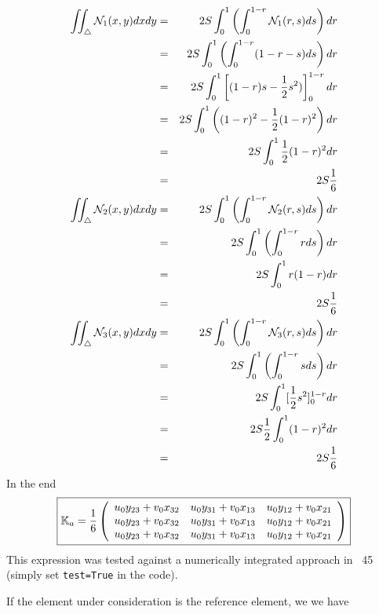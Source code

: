 \begin{eqnarray}
\iint_\triangle {\mathcal{N}}_1(x,y) dxdy 
&=& 2S \int_0^{1} \left(\int_0^{1-r} {\mathcal{N}}_1(r,s)  ds \right) dr \nonumber\\
&=& 2S \int_0^{1} \left(\int_0^{1-r} (1-r-s)  ds \right) dr \nonumber\\
&=& 2S \int_0^{1} \left[ (1-r)s -\frac12 s^2)   \right]_0^{1-r} dr \nonumber\\
&=& 2S \int_0^{1} \left( (1-r)^2 -\frac12 (1-r)^2   \right) dr \nonumber\\
&=& 2S \int_0^{1} \frac12 (1-r)^2  dr \nonumber\\
&=& 2S \frac16 \nonumber\\
\iint_\triangle {\mathcal{N}}_2(x,y) dxdy 
&=& 2S \int_0^{1} \left(\int_0^{1-r} {\mathcal{N}}_2(r,s)  ds \right) dr \nonumber\\
&=& 2S \int_0^{1} \left(\int_0^{1-r} r  ds \right) dr \nonumber\\
&=& 2S \int_0^{1} r (1-r) dr \nonumber\\
&=& 2S \frac16 \nonumber\\
\iint_\triangle {\mathcal{N}}_3(x,y) dxdy 
&=& 2S \int_0^{1} \left(\int_0^{1-r} {\mathcal{N}}_3(r,s)  ds \right) dr \nonumber\\
&=& 2S \int_0^{1} \left(\int_0^{1-r} s  ds \right) dr \nonumber\\
&=& 2S \int_0^{1} [\frac12 s^2]_0^{1-r}  dr \nonumber\\
&=& 2S \frac12 \int_0^{1} (1-r)^2  dr \nonumber\\
&=& 2S \frac16 \nonumber
\end{eqnarray}
In the end
\[
\boxed{
{\mathbb{K}}_a
= \frac16
\left(
\begin{array}{ccc}
u_0 y_{23}+ v_0 x_{32}  & u_0 y_{31}+ v_0 x_{13}  & u_0 y_{12}+ v_0 x_{21}  \\
u_0 y_{23}+ v_0 x_{32}  & u_0 y_{31}+ v_0 x_{13}  & u_0 y_{12}+ v_0 x_{21}  \\
u_0 y_{23}+ v_0 x_{32}  & u_0 y_{31}+ v_0 x_{13}  & u_0 y_{12}+ v_0 x_{21}  
\end{array}
\right)
}
\]
This expression was tested against a numerically integrated approach in 
\stone~45 (simply set \lstinline{test=True} in the code). 

If the element under consideration is the reference element, we 
we have

